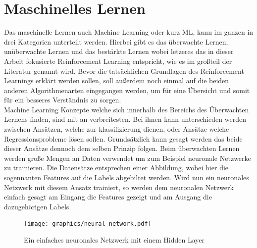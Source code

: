 \documentclass[]{iat}
\begin{document}
\section{Maschinelles Lernen}
Das maschinelle Lernen auch Machine Learning oder kurz ML, kann im ganzen in drei Kategorien unterteilt werden. Hierbei gibt es das überwachte Lernen, unüberwachte Lernen und das bestärkte Lernen wobei letzeres das in dieser Arbeit fokusierte Reinforcement Learning entspricht, wie es im großteil der Literatur genannt wird. Bevor die tatsächlichen Grundlagen des Reinforcement Learnings erklärt werden sollen, soll außerdem noch einmal auf die beiden anderen Algorithmenarten eingegangen werden, um für eine Übersicht und somit für ein besseres Verständnis zu sorgen.\\
Machine Learning Konzepte welche sich innerhalb des Bereichs des Überwachten Lernens finden, sind mit an verbreitesten. Bei ihnen kann unterschieden werden zwischen Ansätzen, welche zur klassifizierung dienen, oder Ansätze welche Regressionsprobleme lösen sollen. Grundsätzlich kann gesagt werden das beide dieser Ansätze dennoch dem selben Prinzip folgen. Beim überwachten Lernen werden große Mengen an Daten verwendet um zum Beispiel neuronale Netzwerke zu trainieren. Die Datensätze entsprechen einer Abbildung, wobei hier die sogennanten Features auf die Labels abgebiltet werden. Wird nun ein neuronales Netzwerk mit diesem Ansatz trainiert, so werden dem neuronalen Netzwerk einfach gesagt am Eingang die Features gezeigt und am Ausgang die dazugehörigen Labels.
\begin{figure}[H]
    \texttt{[image: graphics/neural\_network.pdf]}
    \centering
    \caption{Ein einfaches neuronales Netzwerk mit einem Hidden Layer}
    \label{abb:nn}
\end{figure}
\end{document}
